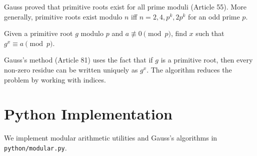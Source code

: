 Gauss proved that primitive roots exist  for all prime moduli (Article 55). More generally, primitive roots exist modulo $n$ iff $n = 2, 4, p^k, 2p^k$ for an odd prime $p$.

\begin{algorithmthm}
Given a primitive root $g$ modulo $p$ and $a \not\equiv 0 \pmod{p}$, find $x$ such that $g^x \equiv a \pmod{p}$.

Gauss's method (Article 81) uses the fact that if $g$ is a primitive root, then every non-zero residue can be written uniquely as $g^x$. The algorithm reduces the problem by working with indices.
\end{algorithmthm}

\section{Python Implementation}
\label{sec:modular-python}

We implement modular arithmetic utilities and Gauss's algorithms in \texttt{python/modular.py}.


